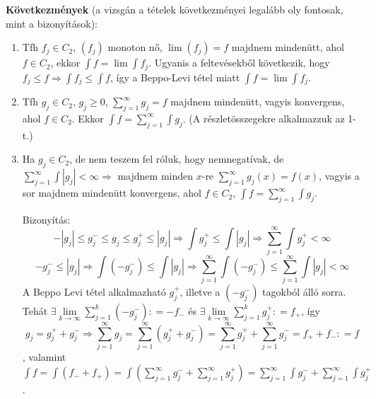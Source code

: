 \documentclass[12pt,a4paper]{scrartcl}
\providecommand{\tightlist}{%
  \setlength{\itemsep}{0pt}\setlength{\parskip}{0pt}}
\newenvironment{bizonyitas}{}{}
\begin{document}
\textbf{Következmények} (a vizsgán a tételek következményei legalább oly
fontosak, mint a bizonyítások):

\begin{enumerate}
\def\labelenumi{\arabic{enumi}.}
\tightlist
\item
  Tfh \(f_{j} \in C_{2}\), \(\left( f_{j} \right)\) monoton nő,
  \(\lim\left( f_{j} \right) = f\) majdnem mindenütt, ahol
  \(f \in C_{2}\), ekkor \({\int f} = \lim{\int f_{j}}\). Ugyanis a
  feltevésekből következik, hogy
  \(\left. f_{j} \leq f\Rightarrow{\int{f_{j} \leq {\int f}}} \right.\),
  így a Beppo-Levi tétel miatt \({\int f} = \lim{\int f_{j}}\).
\item
  Tfh \(g_{j} \in C_{2}\), \(g_{j} \geq 0\),
  \({\sum\limits_{j = 1}^{\infty}g_{j}} = f\) majdnem mindenütt, vagyis
  konvergens, ahol \(f \in C_{2}\). Ekkor
  \({\int f} = {\sum\limits_{j = 1}^{\infty}{\int g_{j}}}\). (A
  részletösszegekre alkalmazzuk az 1-t.)
\item
  Ha \(g_{j} \in C_{2}\), de nem teszem fel róluk, hogy nemnegatívak, de
  \(\left. {\sum\limits_{j = 1}^{\infty}{\int\left| g_{j} \right|}} < \infty\Rightarrow \right.\)
  majdnem minden \(x\)-re
  \({\sum\limits_{j = 1}^{\infty}{g_{j}\left( x \right)}} = f\left( x \right)\),
  vagyis a sor majdnem mindenütt konvergens, ahol \(f \in C_{2}\),
  \({\int f} = {\sum\limits_{j = 1}^{\infty}{\int g_{j}}}\).

  \begin{bizonyitas}

  Bizonyítás: \[
     - \left| {{g_j}} \right| \leqslant g_j^ -  \leqslant {g_j} \leqslant g_j^ +  \leqslant \left| {{g_j}} \right| \Rightarrow  \int {g_j^ + }  \leqslant \int {\left| {{g_j}} \right|}  \Rightarrow \mathop \sum \limits_{j = 1}^\infty  \int {g_j^ + }  < \infty  \]
  \[ - g_j^ -  \leqslant \left| {{g_j}} \right| \Rightarrow  \int {\left( { - g_j^ - } \right)}  \leqslant \int {\left| {{g_j}} \right|}  \Rightarrow \mathop \sum \limits_{j = 1}^\infty  \int {\left( { - g_j^ - } \right)}  \leqslant \mathop \sum \limits_{j = 1}^\infty  \int {\left| {{g_j}} \right|}  < \infty \]
  A Beppo Levi tétel alkalmazható \(g_{j}^{+}\), illetve a
  \(\left( {- g_{j}^{-}} \right)\) tagokból álló sorra. Tehát
  \(\exists\lim\limits_{k\rightarrow\infty}{\sum\limits_{j = 1}^{k}\left( {- g_{j}^{-}} \right)}: = - f_{-}\)
  és
  \(\exists\lim\limits_{k\rightarrow\infty}{\sum\limits_{j = 1}^{k}g_{j}^{+}}: = f_{+}\),
  így
  \[\left. g_{j} = g_{j}^{+} + g_{j}^{-}\Rightarrow{\sum\limits_{j = 1}^{\infty}g_{j}} = {\sum\limits_{j = 1}^{\infty}\left( {g_{j}^{+} + g_{j}^{-}} \right)} = {\sum\limits_{j = 1}^{\infty}g_{j}^{+}} + {\sum\limits_{j = 1}^{\infty}g_{j}^{-}} = f_{+} + f_{-}: = f \right.\],
  valamint
  \({\int f} = {\int\left( {f_{-} + f_{+}} \right)} = {\int\left( {{\sum\limits_{j = 1}^{\infty}g_{j}^{-}} + {\sum\limits_{j = 1}^{\infty}g_{j}^{+}}} \right)} = {\sum\limits_{j = 1}^{\infty}{\int g_{j}^{-}}} + {\sum\limits_{j = 1}^{\infty}{\int g_{j}^{+}}}\).


\end{bizonyitas}
\end{enumerate}
\end{document}
